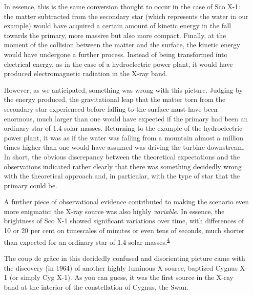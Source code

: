 In essence, this is the same conversion thought to occur in the case of Sco
X-1: the matter subtracted from the secondary star (which represents
the water in our example) would have acquired a certain amount of kinetic energy in the
fall towards the primary, more massive but also more compact. Finally, at the moment of
the collision between the matter and the surface, the kinetic energy would have
undergone a further process. Instead of being transformed into electrical energy, as in
the case of a hydroelectric power plant, it would have produced electromagnetic
radiation in the X-ray band.

However, as we anticipated, something was wrong with this picture. Judging by the energy
produced, the gravitational leap that the matter torn from the secondary star
experienced before falling to the surface must have been enormous, much larger than one
would have expected if the primary had been an ordinary star of 1.4 solar masses.
Returning to the example of the hydroelectric power plant, it was as if the water was
falling from a mountain almost a million times higher than one would have assumed was
driving the turbine downstream. In short, the obvious discrepancy between the
theoretical expectations and the observations indicated rather clearly that there was
something decidedly wrong with the theoretical approach and, in particular, with the
type of star that the primary could be.

A further piece of observational evidence contributed to making the scenario even more
enigmatic: the X-ray source was also highly \emph{variable}. In
essence, the brightness of Sco X-1 showed significant variations over
time, with differences of 10 or 20 per cent on timescales of minutes or even tens of
seconds, much shorter than expected for an ordinary star of 1.4 solar
masses.\textsuperscript{\hyperlink{note:05-04}{4}}

The coup de grâce in this decidedly confused and disorienting picture came with the
discovery (in 1964) of another highly luminous X source, baptized Cygnus X-1 (or simply
Cyg X-1). As you can guess, it was the first source in the
X-ray band at the interior of the constellation of Cygnus, the Swan.

